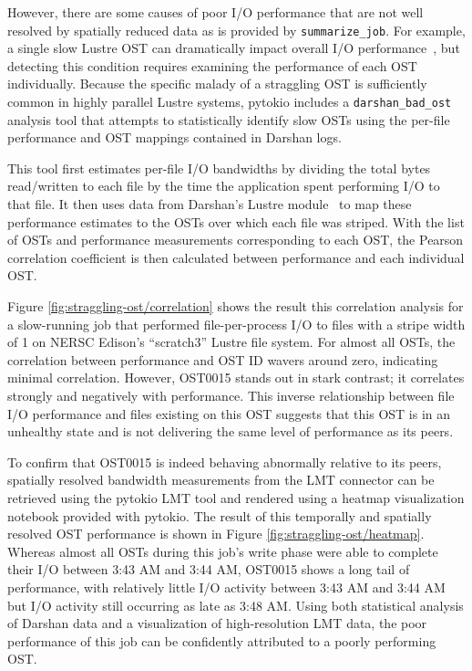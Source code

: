 However, there are some causes of poor I/O performance that are not well resolved by spatially reduced data as is provided by \texttt{summarize\_job}.
For example, a single slow Lustre OST can dramatically impact overall I/O performance~\cite{Byna2013}, but detecting this condition requires examining the performance of each OST individually.
Because the specific malady of a straggling OST is sufficiently common in highly parallel Lustre systems, pytokio includes a \texttt{darshan\_bad\_ost} analysis tool that attempts to statistically identify slow OSTs using the per-file performance and OST mappings contained in Darshan logs.

This tool first estimates per-file I/O bandwidths by dividing the total bytes read/written to each file by the time the application spent performing I/O to that file.
It then uses data from Darshan's Lustre module~\cite{Snyder2016modular} to map these performance estimates to the OSTs over which each file was striped.
With the list of OSTs and performance measurements corresponding to each OST, the Pearson correlation coefficient is then calculated between performance and each individual OST.

Figure \ref{fig:straggling-ost/correlation} shows the result this correlation analysis for a slow-running job that performed file-per-process I/O to files with a stripe width of 1 on NERSC Edison's ``scratch3'' Lustre file system.
For almost all OSTs, the correlation between performance and OST ID wavers around zero, indicating minimal correlation.
However, OST0015 stands out in stark contrast; it correlates strongly and negatively with performance. 
This inverse relationship between file I/O performance and files existing on this OST suggests that this OST is in an unhealthy state and is not delivering the same level of performance as its peers.

To confirm that OST0015 is indeed behaving abnormally relative to its peers, spatially resolved bandwidth measurements from the LMT connector can be retrieved using the pytokio LMT tool and rendered using a heatmap visualization notebook provided with pytokio.
The result of this temporally and spatially resolved OST performance is shown in Figure \ref{fig:straggling-ost/heatmap}.
Whereas almost all OSTs during this job's write phase were able to complete their I/O between 3:43 AM and 3:44 AM, OST0015 shows a long tail of performance, with relatively little I/O activity between 3:43 AM and 3:44 AM but I/O activity still occurring as late as 3:48 AM.
Using both statistical analysis of Darshan data and a visualization of high-resolution LMT data, the poor performance of this job can be confidently attributed to a poorly performing OST.

